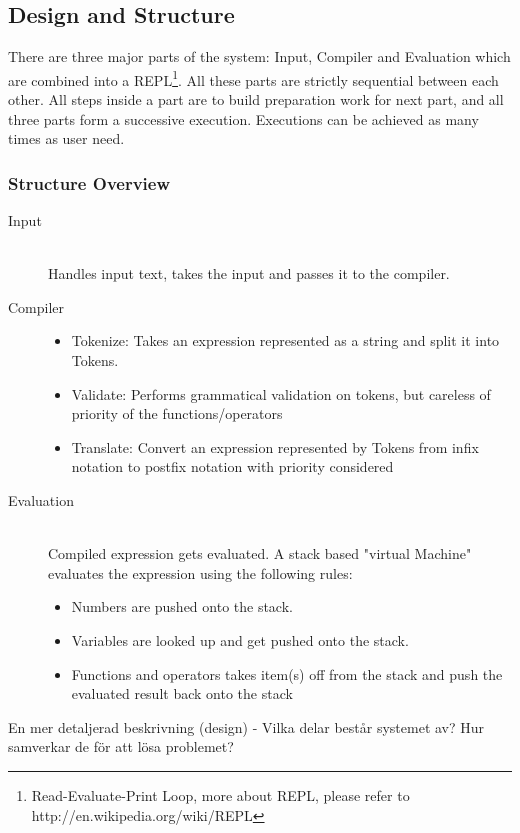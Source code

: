 \documentclass[12pt,a4paper]{article}
\begin{document}
\subsection{Design and Structure}
\textnormal{There are three major parts of the system: Input, Compiler and Evaluation which are combined into a REPL\footnote{Read-Evaluate-Print Loop, more about REPL, please refer to http://en.wikipedia.org/wiki/REPL}. All these parts are strictly sequential between each other. All steps inside a part are to build preparation work for next part, and all three parts form a successive execution. Executions can be achieved as many times as user need.}
\subsubsection{Structure Overview}
\begin{description}
  \item [Input] \hfill \\Handles input text, takes the input and passes it to the compiler.
  \item [Compiler] \hfill
  \begin{itemize}
    \item Tokenize: Takes an expression represented as a string and split it into Tokens.
    \item Validate: Performs grammatical validation on tokens, but careless of priority of the functions/operators \change
    \item Translate: Convert an expression represented by Tokens from infix notation to postfix notation with priority considered \change
  \end{itemize}    
  \item [Evaluation] \hfill \\ Compiled expression gets evaluated. A stack based "virtual Machine" evaluates the expression using the following rules:
  \begin {itemize}
    \item Numbers are pushed onto the stack.
    \item Variables are looked up and get pushed onto the stack.
    \item Functions and operators takes item(s) off from the stack and push the evaluated result back onto the stack
  \end {itemize}
\end{description}


\iffalse
En mer detaljerad beskrivning (design)
- Vilka delar består systemet av? Hur samverkar de för att lösa problemet?
\end{document}
